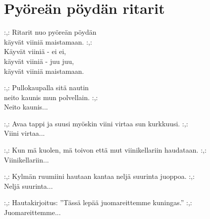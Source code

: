 \section{Pyöreän pöydän ritarit}

:,: Ritarit nuo pyöreän pöydän \\
käyvät viiniä maistamaan. :,: \\
Käyvät viiniä - ei ei, \\
käyvät viiniä - juu juu, \\
käyvät viiniä maistamaan.

:,: Pullokaupalla sitä nautin \\
neito kaunis mun polvellain. :,: \\
Neito kaunis...

:,: Avaa tappi ja suusi myöskin viini virtaa sun kurkkuusi. :,: \\
Viini virtaa...

:,: Kun mä kuolen, mä toivon että mut viinikellariin haudataan. :,: \\
Viinikellariin...

:,: Kylmän ruumiini hautaan kantaa neljä suurinta juoppoa. :,:\\
Neljä suurinta...

:,: Hautakirjoitus: ''Tässä lepää juomareittemme kuningas.'' :,: \\
Juomareittemme...